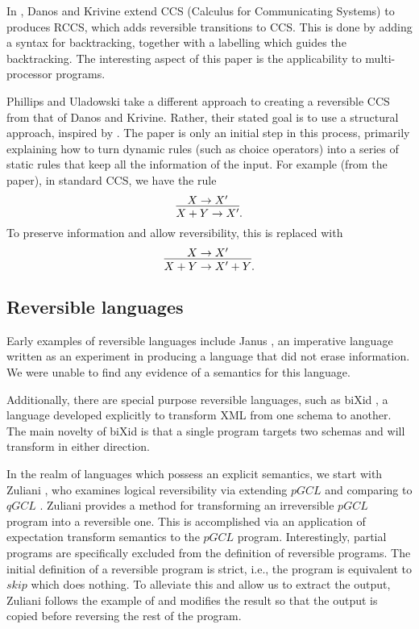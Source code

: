 In \cite{danos2004reversible}, Danos and Krivine extend CCS (Calculus for Communicating Systems)
\cite{milner1980calculus,milner1989communication} to produces RCCS, which adds reversible
transitions to CCS. This is done by adding a syntax for backtracking, together with a labelling
which guides the backtracking. The interesting aspect of this paper is the applicability to
multi-processor programs.

Phillips and Uladowski \cite{phillips2006operational} take a different approach to creating a
reversible CCS from that of Danos and Krivine. Rather, their stated goal is to use a structural
approach, inspired by \cite{abramsky05:reversible}. The paper is only an initial step in this
process, primarily explaining how to turn dynamic rules (such as choice operators) into a series of
static rules that keep all the information of the input. For example (from the paper), in standard
CCS, we have the rule
\[
  \infer{X+Y \to X'}{X\to X'}.
\]
To preserve information and allow reversibility, this is replaced with
\[
  \infer{X+Y \to X' +Y}{X\to X'}.
\]


\subsection{Reversible languages}
\label{subsec:reversible_languages}

Early examples of reversible languages include Janus \cite{lutz1986janus}, an imperative language
written as an experiment in producing a language that did not erase information. We were unable to
find any evidence of a semantics for this language.

Additionally, there are special purpose reversible languages, such as biXid \cite{bixid06}, a
language developed explicitly to transform XML \cite{xml} from one schema to another. The main
novelty of biXid is that a single program targets two schemas and will transform in either direction.

In the realm of languages which possess an explicit semantics, we start with Zuliani
\cite{zuliani01:reversibility}, who examines logical reversibility via extending $pGCL$
\cite{MorganIver99} and comparing to $qGCL$ \cite{sanders:quantum}. Zuliani provides a method for
transforming an irreversible $pGCL$ program into a reversible one. This is accomplished via an
application of expectation transform semantics to the $pGCL$ program. Interestingly, partial
programs are specifically excluded from the definition of reversible programs. The initial
definition of a reversible program is strict, i.e., the program is equivalent to $skip$
which does nothing. To alleviate this and allow us to extract the output, Zuliani follows the example of
\cite{bennett:1973reverse} and modifies the result so that the output is copied before reversing the
rest of the program.

